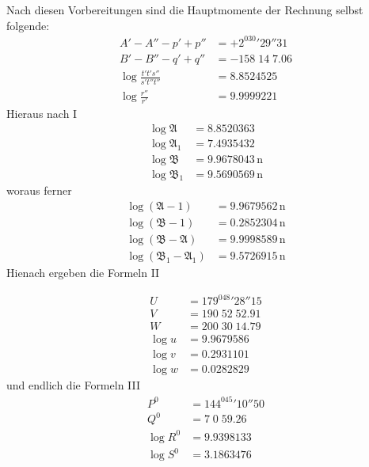 Nach diesen Vorbereitungen sind die Hauptmomente der Rechnung selbst folgende:
\[
\begin{aligned}
A'-A''-p'+p''&=+2^030'29''31\\
B'-B''-q'+q''&=-158\;14\;7.06\\
\log\frac{t't's''}{s't''t''}&=8.8524525\\
\log\frac{r''}{r'}&=9.9999221
\end{aligned}
\]
Hieraus nach I
\[
\begin{aligned}
\log\mathfrak{A}&=8.8520363\\
\log\mathfrak{A}_1&=7.4935432\\
\log\mathfrak{B}&=9.9678043\,\mathrm{n}\\
\log\mathfrak{B}_1&=9.5690569\,\mathrm{n}
\end{aligned}
\]
woraus ferner
\[
\begin{aligned}
\log(\mathfrak{A}-1)&=9.9679562\,\mathrm{n}\\
\log(\mathfrak{B}-1)&=0.2852304\,\mathrm{n}\\
\log(\mathfrak{B}-\mathfrak{A})&=9.9998589\,\mathrm{n}\\
\log(\mathfrak{B}_1-\mathfrak{A}_1)&=9.5726915\,\mathrm{n}
\end{aligned}
\]
Hienach ergeben die Formeln II
\par\clearpage
{}
\[
\begin{aligned}
U&=179^048'28''15\\
V&=190\;52\;52.91\\
W&=200\;30\;14.79\\
\log u&=9.9679586\\
\log v&=0.2931101\\
\log w&=0.0282829
\end{aligned}
\]
und endlich die Formeln III
\[
\begin{aligned}
P^0&=144^045'10''50\\
Q^0&=7\;0\;59.26\\
\log R^0&=9.9398133\\
\log S^0&=3.1863476
\end{aligned}
\]

